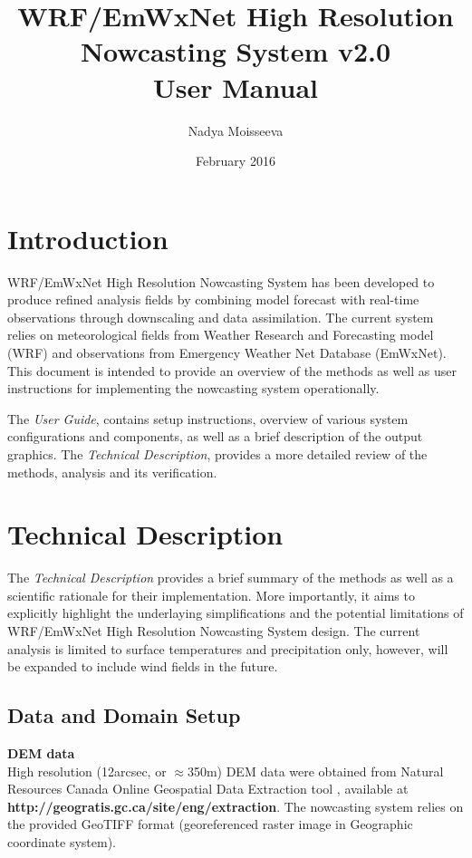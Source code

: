 \documentclass{article}
\begin{document}
\title{WRF/EmWxNet High Resolution Nowcasting System v2.0\\ User Manual}
\author{Nadya Moisseeva}
\date{February 2016}    %

\maketitle
\tableofcontents

\newpage
\section*{Introduction}

WRF/EmWxNet High Resolution Nowcasting System has been developed to produce refined analysis fields by combining model forecast with real-time observations through downscaling and data assimilation. The current system relies on meteorological fields from Weather Research and Forecasting model (WRF) and observations from Emergency Weather Net Database (EmWxNet). This document is intended to provide an overview of the methods as well as user instructions for implementing the nowcasting system operationally. 

The \emph{User Guide}, contains setup instructions, overview of various system configurations and components, as well as a brief description of the output graphics. The \emph{Technical Description}, provides a more detailed review of the methods, analysis and its verification. 

\newpage
\section{Technical Description}
The \emph{Technical Description} provides a brief summary of the methods as well as a scientific rationale for their implementation. More importantly, it aims to explicitly highlight the underlaying simplifications and the potential limitations of WRF/EmWxNet High Resolution Nowcasting System design. The current analysis is limited to surface temperatures and precipitation only, however, will be expanded to include wind fields in the future. 

\subsection{Data and Domain Setup}

\noindent \textbf{DEM data}\\
High resolution (12arcsec, or $\approx$350m) DEM data were obtained from Natural Resources Canada Online Geospatial Data Extraction tool \cite{DEMdata}, available at \textbf{http://geogratis.gc.ca/site/eng/extraction}. The nowcasting system relies on the provided GeoTIFF format (georeferenced raster image in Geographic coordinate system). \\
\end{document}
